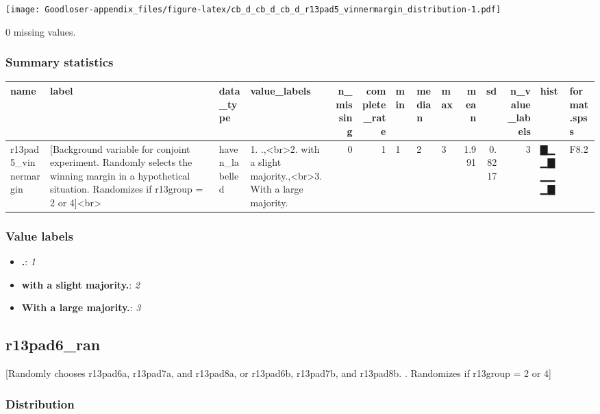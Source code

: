 \documentclass[
]{book}
\providecommand{\tightlist}{%
  \setlength{\itemsep}{0pt}\setlength{\parskip}{0pt}}
\begin{document}
\texttt{[image: Goodloser-appendix\_files/figure-latex/cb\_d\_cb\_d\_cb\_d\_r13pad5\_vinnermargin\_distribution-1.pdf]}

0 missing values.

\hypertarget{r13pad5_vinnermargin_summary}{%
\subsubsection{Summary statistics}\label{r13pad5_vinnermargin_summary}}

\begin{tabular}{l|l|l|l|r|r|l|l|l|r|r|r|l|l}
\hline
name & label & data_type & value_labels & n_missing & complete_rate & min & median & max & mean & sd & n_value_labels & hist & format.spss\\
\hline
r13pad5_vinnermargin & [Background variable for conjoint experiment. Randomly selects the winning margin in a hypothetical situation. Randomizes if r13group = 2 or 4]<br> & haven_labelled & 1. .,<br>2. with a slight majority.,<br>3. With a large majority. & 0 & 1 & 1 & 2 & 3 & 1.991 & 0.8217 & 3 & ▇▁▁▇▁▁▁▇ & F8.2\\
\hline
\end{tabular}

\hypertarget{r13pad5_vinnermargin_labels}{%
\subsubsection{Value labels}\label{r13pad5_vinnermargin_labels}}

\begin{itemize}
\tightlist
\item
  \textbf{.}: \emph{1}
\item
  \textbf{with a slight majority.}: \emph{2}
\item
  \textbf{With a large majority.}: \emph{3}
\end{itemize}

\hypertarget{r13pad6_ran}{%
\subsection{r13pad6\_ran}\label{r13pad6_ran}}

{[}Randomly chooses r13pad6a, r13pad7a, and r13pad8a, or r13pad6b, r13pad7b, and r13pad8b. . Randomizes if r13group = 2 or 4{]}

\hypertarget{r13pad6_ran_distribution}{%
\subsubsection{Distribution}\label{r13pad6_ran_distribution}}
\end{document}

